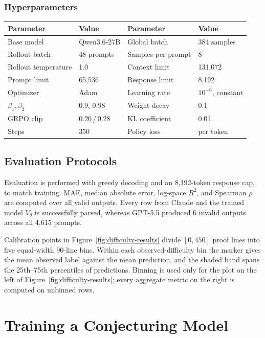 \subsubsection{Hyperparameters}

\begin{center}
\small
\begin{tabular}{@{}ll@{\qquad}ll@{}}
\toprule
Parameter & Value & Parameter & Value \\
\midrule
Base model & Qwen3.6-27B & Global batch & 384 samples \\
Rollout batch & 48 prompts & Samples per prompt & 8 \\
Rollout temperature & 1.0 & Context limit & 131,072 \\
Prompt limit & 65,536 & Response limit & 8,192 \\
Optimizer & Adam & Learning rate & $10^{-6}$, constant \\
$\beta_1,\beta_2$ & $0.9,\,0.98$ & Weight decay & 0.1 \\
GRPO clip & $0.20\,/\,0.28$ & KL coefficient & 0.01 \\
Steps & 350 & Policy loss & per token \\
\bottomrule
\end{tabular}
\end{center}

\subsection{Evaluation Protocols}
\label{app:evaluation}

Evaluation is performed with greedy decoding and an 8,192-token response cap, to match training.
MAE, median absolute error, log-space $R^2$,
and Spearman $\rho$ are computed over all valid outputs. Every row from Claude and the trained model $V_\theta$ is successfully parsed, whereas GPT-5.5 produced 6 invalid outputs across all 4,615 prompts.

Calibration points in Figure~\ref{fig:difficulty-results} divide $[0,450]$ proof lines into five equal-width 90-line bins.
Within each observed-difficulty bin the marker gives the mean observed label against the mean prediction, and the shaded band spans the 25th--75th percentiles of predictions. 
Binning is used only for the plot on the left of Figure~\ref{fig:difficulty-results}; every aggregate metric on the right is computed on unbinned rows.

\section{Training a Conjecturing Model}
\label{app:conjecturing}

